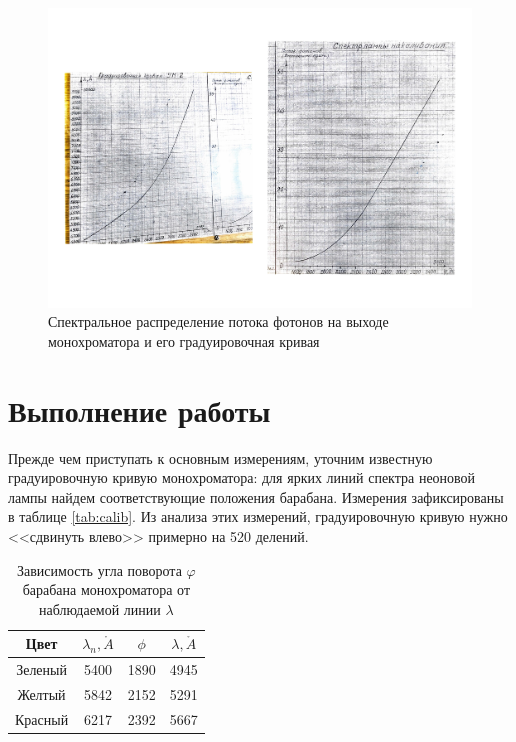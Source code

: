\documentclass[12pt]{kiarticle}
\newcommand{\an}{\ensuremath{\mathring{A}}}
\begin{document}
	\begin{figure}[h]
		\centering	
		\includegraphics[width=\textwidth]{scan}
		\caption{Спектральное распределение потока фотонов на выходе монохроматора и его градуировочная кривая}
		\label{pic:calib}
	\end{figure}
	
	
	\section{Выполнение работы}
	
	Прежде чем приступать к основным измерениям, уточним известную градуировочную кривую монохроматора: для ярких линий спектра неоновой лампы найдем соответствующие положения барабана. Измерения зафиксированы в таблице \ref{tab:calib}. Из анализа этих измерений, градуировочную кривую нужно <<сдвинуть влево>> примерно на 520 делений.
	
	\begin{table}[h]
		\centering
		\caption{Зависимость угла поворота $\varphi$ барабана монохроматора от наблюдаемой линии $\lambda$}
		\begin{tabular}{|c|c|c|c|}
			\hline 
			Цвет & $ \lambda_n, \an $  & $ \phi $ & $ \lambda, \mathring{A} $ \\ 
			\hline 
			Зеленый& 5400 &  1890 & 4945 \\ 
			\hline 
			Желтый & 5842 & 2152 & 5291 \\ 
			\hline 
			Красный & 6217 & 2392 & 5667  \\ 
			\hline 
		\end{tabular} 
	\end{table}
	
\end{document}
